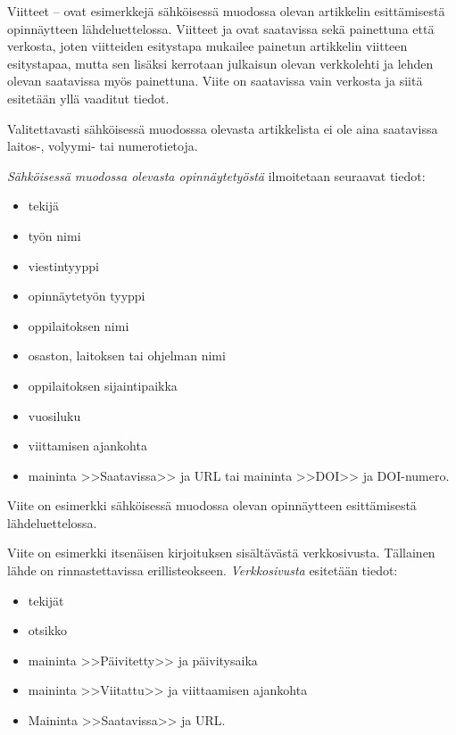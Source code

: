 \documentclass[english,12pt,a4paper,pdftex,elec,utf8]{aaltothesis}
\begin{document}
Viitteet \cite{Ribeiro}--\cite{kone} ovat esimerkkej\"a s\"ahk\"oisess\"a
muodossa olevan artikkelin esitt\"amisest\"a opinn\"aytteen
l\"ahdeluettelossa.  Viitteet \cite{Ribeiro} ja \cite{Stieber} ovat
saatavissa sek\"a painettuna ett\"a verkosta, joten viitteiden esitystapa
mukailee painetun artikkelin viitteen esitystapaa, mutta sen lis\"aksi
kerrotaan julkaisun olevan verkkolehti ja lehden olevan saatavissa
my\"os painettuna.  Viite \cite{kone} on saatavissa vain verkosta ja
siit\"a esitet\"a\"an yll\"a vaaditut tiedot.

Valitettavasti s\"ahk\"oisess\"a muodosssa olevasta artikkelista ei ole aina 
saatavissa lai\-tos-, volyymi- tai numerotietoja.

\textit{S\"ahk\"oisess\"a muodossa olevasta opinn\"aytety\"ost\"a} ilmoitetaan
seuraavat tiedot:
 
\begin{itemize}
\item[--]tekij\"a
\item[--]ty\"on nimi
\item[--]viestintyyppi
\item[--]opinn\"aytety\"on tyyppi
\item[--]oppilaitoksen nimi
\item[--]osaston, laitoksen tai ohjelman nimi
\item[--]oppilaitoksen sijaintipaikka
\item[--]vuosiluku
\item[--]viittamisen ajankohta
\item[--]maininta >>Saatavissa>> ja URL tai 
        maininta >>DOI>> ja DOI-numero.
\end{itemize}

Viite \cite{Adida} on esimerkki s\"ahk\"oisess\"a muodossa olevan
opinn\"aytteen esitt\"amisest\"a l\"ahdeluettelossa.

Viite \cite{viittaaminen} on esimerkki itsen\"aisen kirjoituksen sis\"alt\"av\"ast\"a
verkkosivusta. T\"allainen l\"ahde on rinnastettavissa erillisteokseen.
\textit{Verkkosivusta} esitet\"a\"an tiedot:

\begin{itemize}
\item[--] tekij\"at
\item[--] otsikko
\item[--] maininta >>P\"aivitetty>> ja p\"aivitysaika 
\item[--] maininta >>Viitattu>> ja viittaamisen ajankohta
\item[--] Maininta >>Saatavissa>> ja URL.
\end{itemize}
\end{document}
